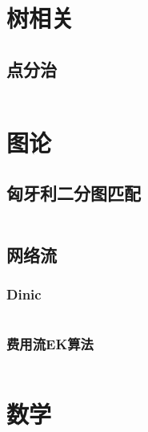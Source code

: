 \documentclass[utf8]{ctexart}
\newcommand{\cpp}[1]{\inputminted[linenos,breaklines,tabsize=4,mathescape]{c++}{#1}}
\begin{document}

\section{树相关}

\subsection{点分治}
\cpp{codes/tree/centroid-decomposition.cpp}



\section{图论}

\subsection[匈牙利]{匈牙利二分图匹配}
\cpp{codes/graph/hungarian.cpp}

\subsection{网络流}

\subsubsection{Dinic}
\cpp{codes/graph/network-flows/dinic.cpp}

\subsubsection[费用流]{费用流EK算法}
\cpp{codes/graph/network-flows/ek-mcmf.cpp}

\section{数学}
\end{document}
